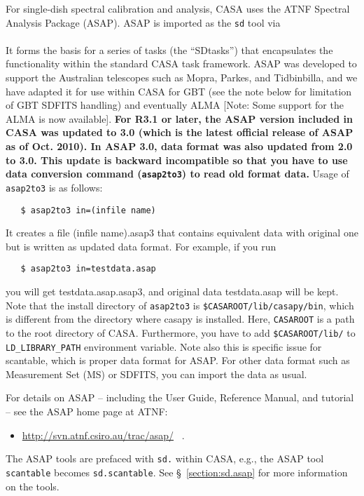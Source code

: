 For single-dish spectral calibration and analysis, 
CASA uses the ATNF Spectral Analysis Package (ASAP).
ASAP is
imported as the {\tt sd} tool via \\


\\

It forms the basis for a series
of tasks (the ``SDtasks'') that encapsulates the functionality
within the standard CASA task framework.  ASAP was developed to
support the Australian telescopes such as Mopra, Parkes, and
Tidbinbilla, and we have adapted it for use within CASA for
GBT (see the note below for limitation of GBT SDFITS handling) 
and eventually ALMA [Note: Some support for the ALMA is now available].  
{\bf For R3.1 or later, the ASAP version included in CASA was updated to 3.0 
(which is the latest official release of ASAP as of Oct. 2010).
In ASAP 3.0, data format was also updated from 2.0 to 3.0. 
This update is backward incompatible so that you have to use data conversion 
command ({\tt asap2to3}) to read old format data.}
Usage of {\tt asap2to3} is as follows:

\begin{verbatim}
   $ asap2to3 in=(infile name)
\end{verbatim}

It creates a file (infile name).asap3 that contains equivalent data with original 
one but is written as updated data format.
For example, if you run 

\begin{verbatim}
   $ asap2to3 in=testdata.asap
\end{verbatim}

you will get testdata.asap.asap3, and original data testdata.asap will be kept.
Note that the install directory of {\tt asap2to3} is \verb!$CASAROOT/lib/casapy/bin!, which is 
different from the directory where casapy is installed. Here, \verb!CASAROOT! is a path to the 
root directory of CASA.
Furthermore, you have to add \verb!$CASAROOT/lib/! to \verb!LD_LIBRARY_PATH! environment variable.
Note also this is specific issue for scantable, which is proper data format 
for ASAP. 
For other data format such as Measurement Set (MS) or SDFITS, you can import the data as usual.

For details on ASAP -- including the User Guide, Reference Manual, and tutorial -- see
the ASAP home page at ATNF: 
\begin{itemize}
   \item \url{http://svn.atnf.csiro.au/trac/asap/} \, .
\end{itemize}
The ASAP tools are prefaced with {\tt sd.} within CASA, e.g., the ASAP tool {\tt scantable} becomes
{\tt sd.scantable}.  See \S~\ref{section:sd.asap} for more
information on the tools.

